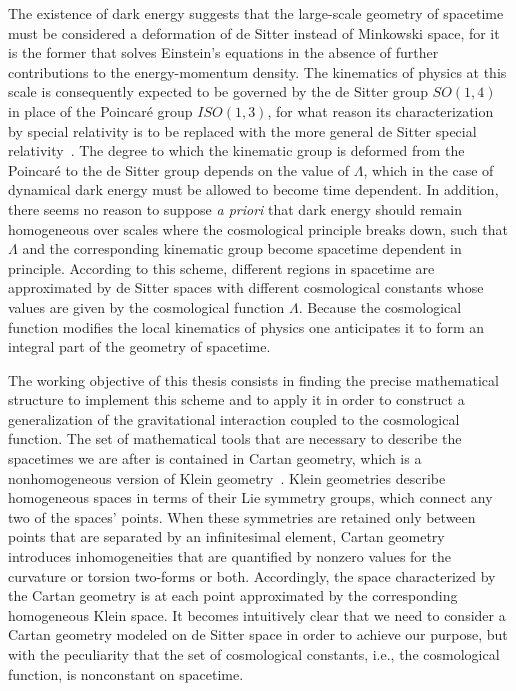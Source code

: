 \documentclass[
final,
11pt,
a4paper,
DIV=11,
headinclude=true,
footinclude=false,
bibliography=totoc,
twoside=true,  %
BCOR=5mm
]{scrbook}
\begin{document}
The existence of dark energy suggests that the large-scale 
geometry of spacetime must be considered a deformation of de 
Sitter instead of Minkowski space, for it is the former that 
solves Einstein's equations in the absence of further 
contributions to the energy-momentum density. The kinematics of 
physics at this scale is consequently expected to be governed by 
the de Sitter group $SO(1,4)$ in place of the Poincar\'e group 
$ISO(1,3)$, for what reason its characterization by special 
relativity is to be replaced with the more general de Sitter 
special relativity~\cite{Aldrovandi:2006vr}. The degree to which 
the kinematic group is deformed from the Poincar\'e to the de 
Sitter group depends on the value of $\Lambda$, which in the case 
of dynamical dark energy must be allowed to become time 
dependent. In addition, there seems no reason to suppose \emph{a 
  priori} that dark energy should remain homogeneous over scales 
where the cosmological principle breaks down, such that $\Lambda$ 
and the corresponding kinematic group become spacetime dependent 
in principle. According to this scheme, different regions in 
spacetime are approximated by de Sitter spaces with different 
cosmological constants whose values are given by the cosmological 
function $\Lambda$. Because the cosmological function modifies 
the local kinematics of physics one anticipates it to form an 
integral part of the geometry of spacetime.

The working objective of this thesis consists in finding the 
precise mathematical structure to implement this scheme and to 
apply it in order to construct a generalization of the 
gravitational interaction coupled to the cosmological function.  
The set of mathematical tools that are necessary to describe the 
spacetimes we are after is contained in Cartan geometry, which is 
a nonhomogeneous version of Klein 
geometry~\cite{sharpe1997diff_geo}. Klein geometries describe 
homogeneous spaces in terms of their Lie symmetry groups, which 
connect any two of the spaces' points.  When these symmetries are 
retained only between points that are separated by an 
infinitesimal element, Cartan geometry introduces inhomogeneities 
that are quantified by nonzero values for the curvature or 
torsion two-forms or both. Accordingly, the space characterized 
by the Cartan geometry is at each point approximated by the 
corresponding homogeneous Klein space. It becomes intuitively 
clear that we need to consider a Cartan geometry modeled on de 
Sitter space in order to achieve our purpose, but with the 
peculiarity that the set of cosmological constants, i.e., the 
cosmological function, is nonconstant on spacetime.
\end{document}
